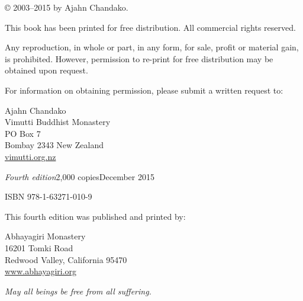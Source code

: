 © 2003--2015 by Ajahn Chandako.

This book has been printed for free distribution. All commercial rights
reserved.

Any reproduction, in whole or part, in any form, for sale, profit or material
gain, is prohibited. However, permission to re-print for free distribution may
be obtained upon request.

For information on obtaining permission, please submit a written request to:

\begin{copyrightindent}
  Ajahn Chandako\\
  Vimutti Buddhist Monastery\\
  PO Box 7\\
  Bombay 2343 New Zealand\\
  \href{http://vimutti.org.nz/}{vimutti.org.nz}
\end{copyrightindent}

\textit{Fourth edition}\hspace*{0.5em}2,000 copies\hspace*{0.5em}December 2015

ISBN 978-1-63271-010-9

This fourth edition was published and printed by:

\begin{copyrightindent}
  Abhayagiri Monastery\\
  16201 Tomki Road\\
  Redwood Valley, California 95470\\
  \href{http://www.abhayagiri.org/}{www.abhayagiri.org}
\end{copyrightindent}

\textit{May all beings be free from all suffering.}

